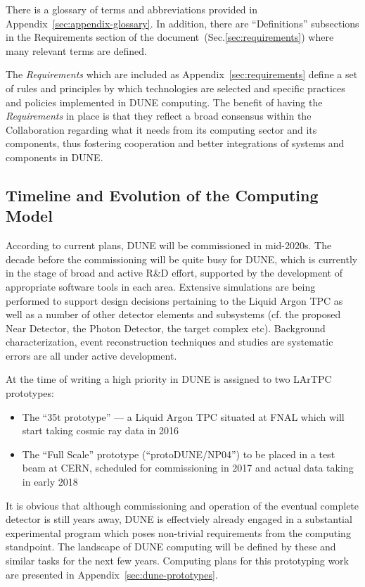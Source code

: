 There is a glossary of terms and abbreviations provided in Appendix~\ref{sec:appendix-glossary}. In addition,
there are ``Definitions'' subsections in the Requirements section of the document~(Sec.\ref{sec:requirements}) where
many relevant terms are defined.

The \textit{Requirements} which are included as Appendix~\ref{sec:requirements}
define a set of rules and principles by which technologies are selected and specific practices and policies implemented in DUNE computing.
The benefit of having the \textit{Requirements} in place is that they reflect a broad consensus within the Collaboration regarding what it needs from
its computing sector and its components, thus fostering cooperation and better integrations of systems and components in DUNE.

\subsection{Timeline and Evolution of the Computing Model}
According to current plans, DUNE will be commissioned in mid-2020s. The decade before the commissioning will be quite busy
for DUNE, which is currently in the stage of broad and active R\&D effort, supported by the development of appropriate 
software tools in each area. Extensive simulations are being performed to support design decisions pertaining to the Liquid 
Argon TPC as well as a number of other detector elements and subsystems (cf. the proposed Near Detector, the Photon Detector, 
the target complex etc). Background characterization, event reconstruction techniques and studies are systematic errors are all under active development.

At the time of writing a high priority in DUNE is assigned to two LArTPC prototypes:
\begin{itemize}
\item The ``35t prototype'' --- a Liquid Argon TPC situated at FNAL which will start taking cosmic ray data in 2016
\item The ``Full Scale'' prototype (``protoDUNE/NP04'') to be placed in a test beam at CERN, scheduled for commissioning in 2017 and actual data taking in early 2018
\end{itemize}
\noindent
It is obvious that although commissioning and operation of the eventual complete detector is still years away, DUNE is effectviely
already engaged in a substantial experimental program which poses non-trivial requirements from the computing standpoint. The
landscape of DUNE computing will be defined by these and similar tasks for the next few years. Computing plans for this prototyping
work are presented in Appendix~\ref{sec:dune-prototypes}.

